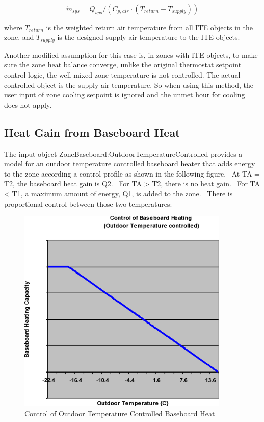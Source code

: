 \begin{equation}
{\dot m_{sys}} = {Q_{sys}}/({C_{p,air}} \cdot ({T_{return}} - {T_{supply}}))
\end{equation}

where $T_{return}$ is the weighted return air temperature from all ITE objects in the zone, and $T_{supply}$ is the designed supply air temperature to the ITE objects.

Another modified assumption for this case is, in zones with ITE objects, to make sure the zone heat balance converge, unlike the original thermostat setpoint control logic, the well-mixed zone temperature is not controlled. The actual controlled object is the supply air temperature. So when using this method, the user input of zone cooling setpoint is ignored and the unmet hour for cooling does not apply.

\subsection{Heat Gain from Baseboard Heat}\label{heat-gain-from-baseboard-heat}

The input object ZoneBaseboard:OutdoorTemperatureControlled provides a model for an outdoor temperature controlled baseboard heater that adds energy to the zone according a control profile as shown in the following figure.~ At TA = T2, the baseboard heat gain is Q2.~ For TA \textgreater{} T2, there is no heat gain.~ For TA \textless{} T1, a maximum amount of energy, Q1, is added to the zone.~ There is proportional control between those two temperatures:

\begin{figure}[hbtp] %
\centering
\includegraphics[width=0.9\textwidth, height=0.9\textheight, keepaspectratio=true]{media/image5821.png}
\caption{Control of Outdoor Temperature Controlled Baseboard Heat \protect \label{fig:control-of-outdoor-temperature-controlled}}
\end{figure}

